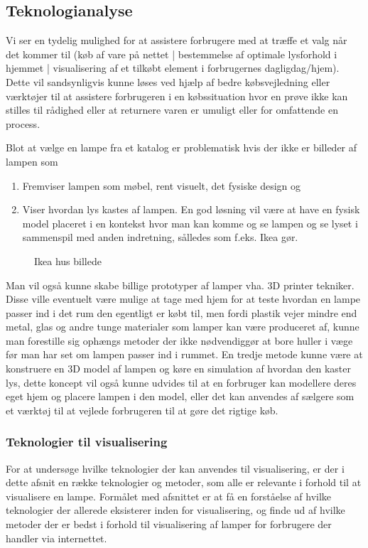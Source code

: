 \subsection{Teknologianalyse}

Vi ser en tydelig mulighed for at assistere forbrugere med at træffe et valg når det kommer til (køb af vare på nettet | bestemmelse af optimale lysforhold i hjemmet | visualisering af et tilkøbt element i forbrugernes dagligdag/hjem). Dette vil sandsynligvis kunne løses ved hjælp af bedre købsvejledning eller værktøjer til at assistere forbrugeren i en købssituation hvor en prøve ikke kan stilles til rådighed eller at returnere varen er umuligt eller for omfattende en process.

Blot at vælge en lampe fra et katalog er problematisk hvis der ikke er billeder af lampen som 
\begin{enumerate}
    \item Fremviser lampen som møbel, rent visuelt, det fysiske design og 
    \item Viser hvordan lys kastes af lampen. En god løsning vil være at have en fysisk model placeret i en kontekst hvor man kan komme og se lampen og se lyset i sammenspil med anden indretning, sålledes som f.eks. Ikea gør.
\end{enumerate}
\begin{figure}[H]
    \centering
    \fbox{\rule{\textwidth}{5cm}}
    \caption{Ikea hus billede}
\end{figure} 

Man vil også kunne skabe billige prototyper af lamper vha. 3D printer tekniker. Disse ville eventuelt være mulige at tage med hjem for at teste hvordan en lampe passer ind i det rum den egentligt er købt til, men fordi plastik vejer mindre end metal, glas og andre tunge materialer som lamper kan være produceret af, kunne man forestille sig ophængs metoder der ikke nødvendiggør at bore huller i væge før man har set om lampen passer ind i rummet.
En tredje metode kunne være at konstruere en 3D model af lampen og køre en simulation af hvordan den kaster lys, dette koncept vil også kunne udvides til at en forbruger kan modellere deres eget hjem og placere lampen i den model, eller det kan anvendes af sælgere som et værktøj til at vejlede forbrugeren til at gøre det rigtige køb.


\subsubsection{Teknologier til visualisering}
For at undersøge hvilke teknologier der kan anvendes til visualisering, er der i dette afsnit en række teknologier og metoder, som alle er relevante i forhold til at visualisere en lampe. Formålet med afsnittet er at få en forståelse af hvilke teknologier der allerede eksisterer inden for visualisering, og finde ud af hvilke metoder der er bedst i forhold til visualisering af lamper for forbrugere der handler via internettet.


